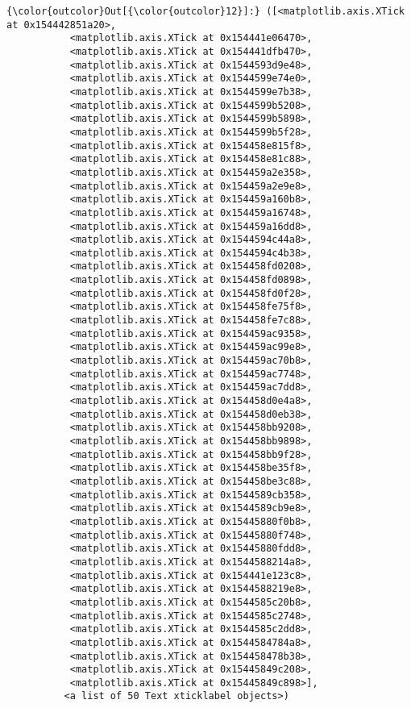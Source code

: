 \documentclass[11pt]{article}
\begin{document}
\begin{Verbatim}[commandchars=\\\{\}]
{\color{outcolor}Out[{\color{outcolor}12}]:} ([<matplotlib.axis.XTick at 0x154442851a20>,
           <matplotlib.axis.XTick at 0x154441e06470>,
           <matplotlib.axis.XTick at 0x154441dfb470>,
           <matplotlib.axis.XTick at 0x1544593d9e48>,
           <matplotlib.axis.XTick at 0x1544599e74e0>,
           <matplotlib.axis.XTick at 0x1544599e7b38>,
           <matplotlib.axis.XTick at 0x1544599b5208>,
           <matplotlib.axis.XTick at 0x1544599b5898>,
           <matplotlib.axis.XTick at 0x1544599b5f28>,
           <matplotlib.axis.XTick at 0x154458e815f8>,
           <matplotlib.axis.XTick at 0x154458e81c88>,
           <matplotlib.axis.XTick at 0x154459a2e358>,
           <matplotlib.axis.XTick at 0x154459a2e9e8>,
           <matplotlib.axis.XTick at 0x154459a160b8>,
           <matplotlib.axis.XTick at 0x154459a16748>,
           <matplotlib.axis.XTick at 0x154459a16dd8>,
           <matplotlib.axis.XTick at 0x1544594c44a8>,
           <matplotlib.axis.XTick at 0x1544594c4b38>,
           <matplotlib.axis.XTick at 0x154458fd0208>,
           <matplotlib.axis.XTick at 0x154458fd0898>,
           <matplotlib.axis.XTick at 0x154458fd0f28>,
           <matplotlib.axis.XTick at 0x154458fe75f8>,
           <matplotlib.axis.XTick at 0x154458fe7c88>,
           <matplotlib.axis.XTick at 0x154459ac9358>,
           <matplotlib.axis.XTick at 0x154459ac99e8>,
           <matplotlib.axis.XTick at 0x154459ac70b8>,
           <matplotlib.axis.XTick at 0x154459ac7748>,
           <matplotlib.axis.XTick at 0x154459ac7dd8>,
           <matplotlib.axis.XTick at 0x154458d0e4a8>,
           <matplotlib.axis.XTick at 0x154458d0eb38>,
           <matplotlib.axis.XTick at 0x154458bb9208>,
           <matplotlib.axis.XTick at 0x154458bb9898>,
           <matplotlib.axis.XTick at 0x154458bb9f28>,
           <matplotlib.axis.XTick at 0x154458be35f8>,
           <matplotlib.axis.XTick at 0x154458be3c88>,
           <matplotlib.axis.XTick at 0x1544589cb358>,
           <matplotlib.axis.XTick at 0x1544589cb9e8>,
           <matplotlib.axis.XTick at 0x15445880f0b8>,
           <matplotlib.axis.XTick at 0x15445880f748>,
           <matplotlib.axis.XTick at 0x15445880fdd8>,
           <matplotlib.axis.XTick at 0x1544588214a8>,
           <matplotlib.axis.XTick at 0x154441e123c8>,
           <matplotlib.axis.XTick at 0x1544588219e8>,
           <matplotlib.axis.XTick at 0x1544585c20b8>,
           <matplotlib.axis.XTick at 0x1544585c2748>,
           <matplotlib.axis.XTick at 0x1544585c2dd8>,
           <matplotlib.axis.XTick at 0x1544584784a8>,
           <matplotlib.axis.XTick at 0x154458478b38>,
           <matplotlib.axis.XTick at 0x15445849c208>,
           <matplotlib.axis.XTick at 0x15445849c898>],
          <a list of 50 Text xticklabel objects>)
\end{Verbatim}
            
\end{document}
